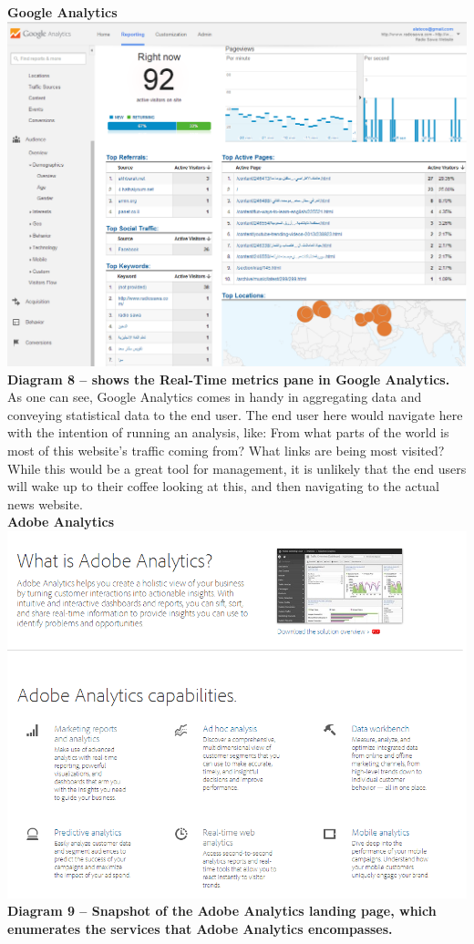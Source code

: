 \documentclass[12pt]{article}
\begin{document}
\noindent\textbf{Google Analytics} \\
\noindent\includegraphics[scale=0.45]{img/google_analytics}
\noindent\textbf{Diagram 8 -- shows the Real-Time metrics pane in Google Analytics.} \\

As one can see, Google Analytics comes in handy in aggregating data and conveying statistical data to the end user. The end user here would navigate here with the intention of running an analysis, like: From what parts of the world is most of this website's traffic coming from? What links are being most visited?
While this would be a great tool for management, it is unlikely that the end users will wake up to their coffee looking at this, and then navigating to the actual news website. \\

\noindent\textbf{Adobe Analytics} \\
\noindent\includegraphics[scale=0.6]{img/adobe_analytics}
\noindent\textbf{Diagram 9 -- Snapshot of the Adobe Analytics landing page, which enumerates the services that Adobe Analytics encompasses.} \\
\end{document}
